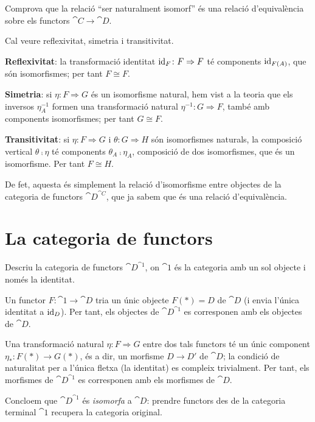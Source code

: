 \begin{exercici}
Comprova que la relació \enquote{ser naturalment isomorf} és una relació d'equivalència sobre els functors $\cat{C}\to\cat{D}$.
\end{exercici}

\begin{solucio}
Cal veure reflexivitat, simetria i transitivitat.

\textbf{Reflexivitat}: la transformació identitat $\operatorname{id}_F\colon F\Rightarrow F$ té components $\operatorname{id}_{F(A)}$, que són isomorfismes; per tant $F\cong F$.

\textbf{Simetria}: si $\eta\colon F\Rightarrow G$ és un isomorfisme natural, hem vist a la teoria que els inversos $\eta_A^{-1}$ formen una transformació natural $\eta^{-1}\colon G\Rightarrow F$, també amb components isomorfismes; per tant $G\cong F$.

\textbf{Transitivitat}: si $\eta\colon F\Rightarrow G$ i $\theta\colon G\Rightarrow H$ són isomorfismes naturals, la composició vertical $\theta\comp\eta$ té components $\theta_A\comp\eta_A$, composició de dos isomorfismes, que és un isomorfisme. Per tant $F\cong H$.

De fet, aquesta és simplement la relació d'isomorfisme entre objectes de la categoria de functors $\cat{D}^{\cat{C}}$, que ja sabem que és una relació d'equivalència.
\end{solucio}

\section{La categoria de functors}

\begin{exercici}
Descriu la categoria de functors $\cat{D}^{\cat{1}}$, on $\cat{1}$ és la categoria amb un sol objecte i només la identitat.
\end{exercici}

\begin{solucio}
Un functor $F\colon\cat{1}\to\cat{D}$ tria un únic objecte $F(\ast)=D$ de $\cat{D}$ (i envia l'única identitat a $\operatorname{id}_D$). Per tant, els objectes de $\cat{D}^{\cat{1}}$ es corresponen amb els objectes de $\cat{D}$.

Una transformació natural $\eta\colon F\Rightarrow G$ entre dos tals functors té un únic component $\eta_\ast\colon F(\ast)\to G(\ast)$, és a dir, un morfisme $D\to D'$ de $\cat{D}$; la condició de naturalitat per a l'única fletxa (la identitat) es compleix trivialment. Per tant, els morfismes de $\cat{D}^{\cat{1}}$ es corresponen amb els morfismes de $\cat{D}$.

Concloem que $\cat{D}^{\cat{1}}$ és \emph{isomorfa} a $\cat{D}$: prendre functors des de la categoria terminal $\cat{1}$ recupera la categoria original.
\end{solucio}

